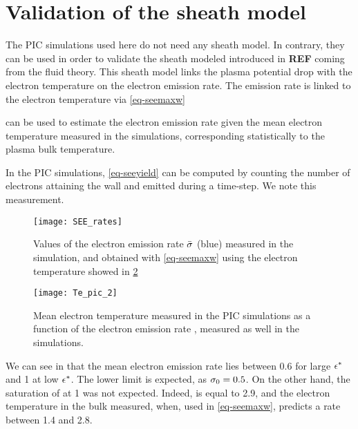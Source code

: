 
\section{Validation of the sheath model }
  \label{sec-sheath_validation}
  
  The \ac{PIC} simulations used here do not need any sheath model.
  In contrary, they can be used in order to validate the sheath modeled introduced in {\bf REF} coming from the fluid theory.
  This sheath model links the plasma potential drop with the electron temperature on the electron emission rate.
  The emission rate is linked to the electron temperature via \cref{eq-seemaxw}

   can be used to estimate the electron emission rate given the mean electron temperature measured in the simulations, corresponding statistically to the plasma bulk temperature.   
  
  In the \ac{PIC} simulations, \cref{eq-seeyield} can be computed by counting the number of electrons attaining the wall and emitted during a time-step.
  We note \ratepic this measurement.
   
  \begin{figure}[hbtp]
    \centering
    \texttt{[image: SEE\_rates]}
    \caption{Values of the electron emission rate $ \bar{\sigma } $ (blue) measured in the simulation, and obtained with \cref{eq-seemaxw} using the electron temperature showed in \cref{fig-Tevsproba} }
    \label{fig-seeparamesMaxw}
  \end{figure}
  
  \begin{figure}[hbtp]
    \centering
    \texttt{[image: Te\_pic\_2]}
    \caption{Mean electron temperature measured in the \ac{PIC} simulations as a function of the electron emission rate \rate, measured as well in the simulations.  }
    \label{fig-Tevsproba}
  \end{figure}
  
  
  We can see in  that the mean electron emission rate lies between 0.6 for large $\epsilon^{*}$ and 1 at low $\epsilon^{*}$.
  The lower limit is expected, as $\sigma _0 = 0.5$.
  On the other hand, the saturation of \ratepic at 1 was not expected.
  Indeed, \ratemaxw is equal to 2.9, and the electron temperature in the bulk measured, when, used in \cref{eq-seemaxw}, predicts a rate between 1.4 and 2.8.
  
